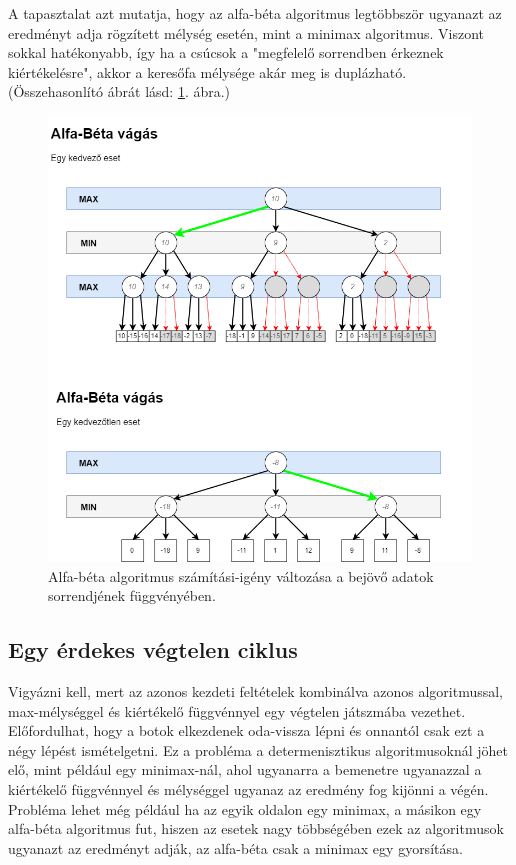 \documentclass[twoside, a4paper, 12pt]{book}
\begin{document}
A tapasztalat azt mutatja, hogy az alfa-béta algoritmus legtöbbször ugyanazt az eredményt adja rögzített mélység esetén, mint a minimax algoritmus. Viszont sokkal hatékonyabb, így ha a csúcsok a "megfelelő sorrendben érkeznek kiértékelésre", akkor a keresőfa mélysége akár meg is duplázható. \\ (Összehasonlító ábrát lásd: \ref{fig:alphabeta_examples}. ábra.)

\begin{figure}[htbp]
	\centering
	\includegraphics[width=\textwidth]{img/alphabeta_examples.png}
	\caption{Alfa-béta algoritmus számítási-igény változása a bejövő adatok sorrendjének függvényében.}
	\label{fig:alphabeta_examples}
\end{figure}

\subsection{Egy érdekes végtelen ciklus}
Vigyázni kell, mert az azonos kezdeti feltételek kombinálva azonos algoritmussal, max-mélységgel és kiértékelő függvénnyel egy végtelen játszmába vezethet. Előfordulhat, hogy a botok elkezdenek oda-vissza lépni és onnantól csak ezt a négy lépést ismételgetni. Ez a probléma a determenisztikus algoritmusoknál jöhet elő, mint például egy minimax-nál, ahol ugyanarra a bemenetre ugyanazzal a kiértékelő függvénnyel és mélységgel ugyanaz az eredmény fog kijönni a végén. Probléma lehet még például ha az egyik oldalon egy minimax, a másikon egy alfa-béta algoritmus fut, hiszen az esetek nagy többségében ezek az algoritmusok ugyanazt az eredményt adják, az alfa-béta csak a minimax egy gyorsítása.
\end{document}
